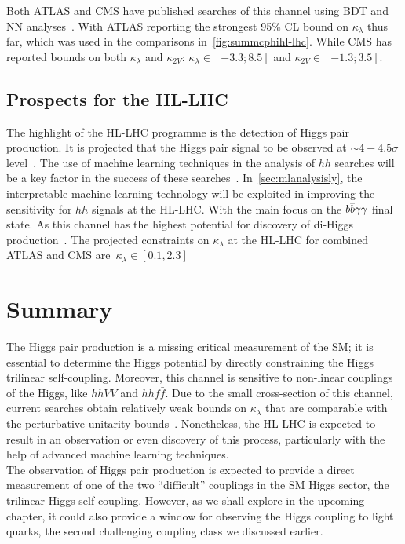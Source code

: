 Both ATLAS and CMS have published searches of this channel using  BDT and NN analyses~\cite{ATLAS:2021jki,CMS:2020tkr}. With ATLAS reporting the strongest 95\% CL bound on $\kappa_\lambda$ thus far, which was used in the comparisons in~\autoref{fig:summcphihl-lhc}. While CMS has reported bounds on both $\kappa_\lambda$ and $\kappa_{2V}$: $\kappa_{\lambda} \in [-3.3;8.5]$ and $\kappa_{2V} \in [-1.3; 3.5]$.                                                                                       
\subsection{Prospects for the HL-LHC}
The highlight of the HL-LHC programme is the detection of Higgs pair production. It is projected that the Higgs pair signal to be observed at $\sim  4- 4.5\sigma $ level~\cite{DiMicco:2019ngk}. The use of machine learning techniques in the analysis of $hh$ searches will be a key factor in the success of these searches~\cite{Cepeda:2019klc}. In~\autoref{sec:mlanalysisly}, the interpretable machine learning technology will be exploited in improving the sensitivity for $hh$ signals at the HL-LHC. With the main focus on the $b\overline b\gamma\gamma$ final state. As this channel has the highest potential for discovery of di-Higgs production~\cite{Azatov:2015oxa, Baur:2003gp, Baglio:2012np, Kling:2016lay, Barger:2013jfa, Adhikary:2017jtu, Alves:2017ued}. The projected constraints on $\kappa_\lambda$ at the HL-LHC for combined ATLAS and CMS are~$\kappa_{\lambda} \in [0.1,2.3]$~\cite{DiMicco:2019ngk,Cepeda:2019klc}

\section{Summary \label{summtrilinear}  }
The Higgs pair production is a missing critical measurement of the SM; it is essential to determine the Higgs potential by directly constraining the Higgs trilinear self-coupling. Moreover, this channel is sensitive to non-linear couplings of the Higgs, like $hhVV$ and $hh f\bar f$. Due to the small cross-section of this channel, current searches obtain relatively weak bounds on $\kappa_{\lambda}$ that are comparable with the perturbative unitarity bounds~\cite{DiLuzio:2017tfn}. Nonetheless, the HL-LHC is expected to result in an observation or even discovery of this process, particularly with the help of advanced machine learning techniques.\\ The observation of Higgs pair production is expected to provide a direct measurement of one of the two ``difficult'' couplings in the SM Higgs sector,  the trilinear Higgs self-coupling. However, as we shall explore in the upcoming chapter, it could also provide a window for observing the Higgs coupling to light quarks, the second challenging coupling class we discussed earlier.
